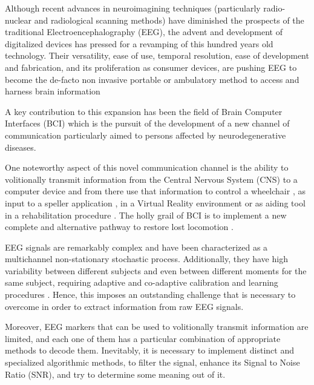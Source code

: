 \documentclass[entropy,article,submit,moreauthors,pdftex,10pt,a4paper]{mdpi}
\begin{document}
Although recent advances in neuroimagining techniques (particularly radio-nuclear and radiological scanning methods) \citep{Schomer2010} have diminished the prospects of the traditional Electroencephalography (EEG), the advent and development of digitalized devices has pressed for a revamping of this hundred years old technology.  Their versatility, ease of use, temporal resolution, ease of development and fabrication, and its proliferation as consumer devices, are pushing EEG to become the de-facto non invasive portable or ambulatory method to access and harness brain information \cite{DeVos2014}

A key contribution to this expansion has been the field of Brain Computer Interfaces (BCI) \citep{WolpawJonathanR2012} which is the pursuit of the development of a new channel of communication particularly aimed to persons affected by neurodegenerative diseases.

One noteworthy aspect of this novel communication channel is the ability to volitionally transmit information from the Central Nervous System (CNS) to a computer device and from there use that information to control a wheelchair \citep{Carlson2013}, as input to a speller application \citep{Guger2009a}, in a Virtual Reality environment \citep{Lotte2013} or as aiding tool in a rehabilitation procedure \citep{Jure2016}.  The holly grail of BCI is to implement a new complete and alternative pathway to restore lost locomotion \citep{WolpawJonathanR2012}.

EEG signals are remarkably complex and have been characterized as a multichannel non-stationary stochastic process.  Additionally, they have high variability between different subjects and even between different moments for the same subject, requiring adaptive and co-adaptive calibration and learning procedures \citep{Clerc}.  Hence, this imposes an outstanding challenge that is necessary to overcome in order to extract information from raw EEG signals.

Moreover, EEG markers \citep{Clerc} that can be used to volitionally transmit information are limited, and each one of them has a particular combination of appropriate methods to decode them. Inevitably, it is necessary to implement  distinct and specialized algorithmic methods, to filter the signal, enhance its Signal to Noise Ratio (SNR), and try to determine some meaning out of it.  

\end{document}
